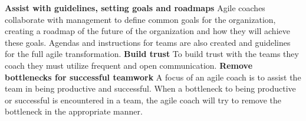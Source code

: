 \documentclass[11pt,a4paper]{report}
\begin{document}
\newline
\newline
\noindent\textbf{Assist with guidelines, setting goals and roadmaps}\newline
Agile coaches collaborate with management to define common goals for the organization, creating a roadmap of the future of the organization and how they will achieve these goals. Agendas and instructions for teams are also created and guidelines for the full agile transformation.
\newline
\newline
\noindent\textbf{Build trust}\newline
To build trust with the teams they coach they must utilize frequent and open communication. 
\newline
\newline
\noindent\textbf{Remove bottlenecks for successful teamwork}\newline
A focus of an agile coach is to assist the team in being productive and successful. When a bottleneck to being productive or successful is encountered in a team, the agile coach will try to remove the bottleneck in the appropriate manner.
\end{document}
